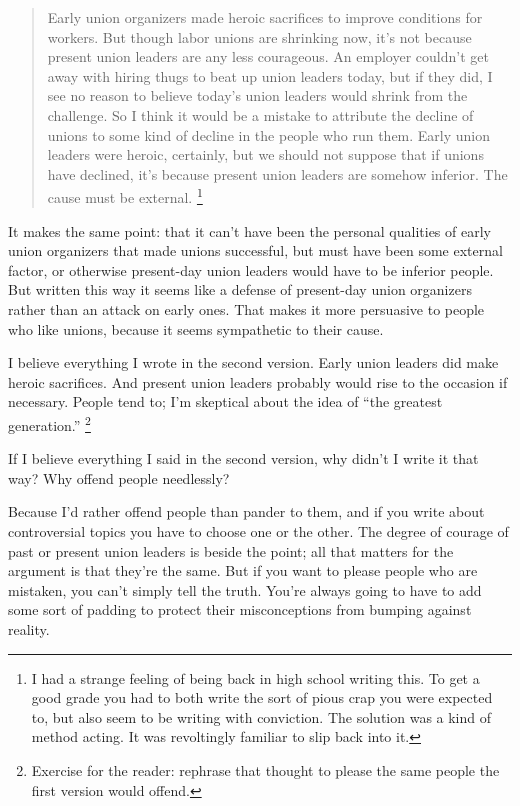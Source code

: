 \begin{quote}
Early union organizers made heroic sacrifices to improve conditions for
workers. But though labor unions are shrinking now, it's not because
present union leaders are any less courageous. An employer couldn't get
away with hiring thugs to beat up union leaders today, but if they did,
I see no reason to believe today's union leaders would shrink from the
challenge. So I think it would be a mistake to attribute the decline of
unions to some kind of decline in the people who run them. Early union
leaders were heroic, certainly, but we should not suppose that if unions
have declined, it's because present union leaders are somehow inferior.
The cause must be external. \footnote{I had a strange feeling of being back in high school writing
this. To get a good grade you had to both write the sort of pious crap
you were expected to, but also seem to be writing with conviction. The
solution was a kind of method acting. It was revoltingly familiar to
slip back into it.}
\end{quote}

It makes the same point: that it can't have been the personal qualities
of early union organizers that made unions successful, but must have
been some external factor, or otherwise present-day union leaders would
have to be inferior people. But written this way it seems like a defense
of present-day union organizers rather than an attack on early ones.
That makes it more persuasive to people who like unions, because it
seems sympathetic to their cause.

I believe everything I wrote in the second version. Early union leaders
did make heroic sacrifices. And present union leaders probably would
rise to the occasion if necessary. People tend to; I'm skeptical about
the idea of ``the greatest generation.'' \footnote{Exercise for the reader: rephrase that thought to please the
same people the first version would offend.}

If I believe everything I said in the second version, why didn't I write
it that way? Why offend people needlessly?

Because I'd rather offend people than pander to them, and if you write
about controversial topics you have to choose one or the other. The
degree of courage of past or present union leaders is beside the point;
all that matters for the argument is that they're the same. But if you
want to please people who are mistaken, you can't simply tell the truth.
You're always going to have to add some sort of padding to protect their
misconceptions from bumping against reality.

